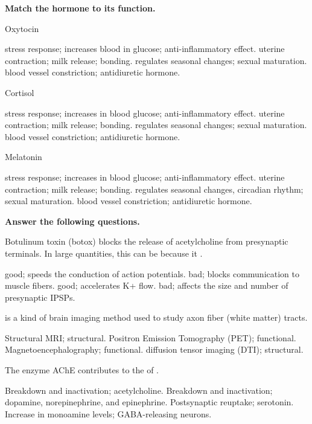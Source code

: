 \documentclass[answers]{exam}
\begin{document}
\begin{questions}
\vspace{.75cm}
\textbf{Match the hormone to its function.}

\question Oxytocin
\begin{choices}
\choice stress response; increases blood in glucose; anti-inflammatory effect.
\correctchoice uterine contraction; milk release; bonding.
\choice regulates seasonal changes; sexual maturation.
\choice blood vessel constriction; antidiuretic hormone.
\end{choices}

\question Cortisol
\begin{choices}
\correctchoice stress response; increases in blood glucose; anti-inflammatory effect.
\choice uterine contraction; milk release; bonding.
\choice regulates seasonal changes; sexual maturation.
\choice blood vessel constriction; antidiuretic hormone.
\end{choices}

\question Melatonin
\begin{choices}
\choice stress response; increases in blood glucose; anti-inflammatory effect.
\choice uterine contraction; milk release; bonding.
\correctchoice regulates seasonal changes, circadian rhythm; sexual maturation.
\choice blood vessel constriction; antidiuretic hormone.
\end{choices}

\newpage

\textbf{Answer the following questions.}

\question Botulinum toxin (botox) blocks the release of acetylcholine from presynaptic terminals. In large quantities, this can be \fillin because it \fillin.
\begin{choices}
\choice  good; speeds the conduction of action potentials.
\correctchoice  bad; blocks communication to muscle fibers.
\choice  good; accelerates K+ flow.
\choice  bad; affects the size and number of presynaptic IPSPs.
\end{choices}

\question \fillin is a kind of \fillin brain imaging method used to study axon fiber (white matter) tracts.
\begin{choices}
\choice Structural MRI; structural.
\choice Positron Emission Tomography (PET); functional.
\choice Magnetoencephalography; functional.
\correctchoice diffusion tensor imaging (DTI); structural.
\end{choices}

\question The enzyme AChE contributes to the \fillin of \fillin.
\begin{choices}
\correctchoice  Breakdown and inactivation; acetylcholine.
\choice  Breakdown and inactivation; dopamine, norepinephrine, and epinephrine.
\choice  Postsynaptic reuptake; serotonin.
\choice  Increase in monoamine levels; GABA-releasing neurons.
\end{choices}


\end{questions}
\end{document}
